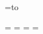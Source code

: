 \headline={\hbox to }
\newtoks\oddhead
\newtoks\evenhead
\newtoks\titlehead
\def\defineheads{
  \ifnum\BodyColumns=2
    \oddhead={\hbox to \columnshift{}\rlap{\RHoddleft}\hfil\RHoddcenter\hfil\hbox to \columnshift{}\llap{\RHoddright}}
    \evenhead={\hbox to \columnshift{}\rlap{\RHevenleft}\hfil\RHevencenter\hfil\hbox to \columnshift{}\llap{\RHevenright}}
    \titlehead={\hbox to \columnshift{}\rlap{\RHtitleleft}\hfil\RHtitlecenter\hfil\hbox to \columnshift{}\llap{\RHtitleright}}
  \else
    \oddhead={\hbox to \columnshift{}\rlap{\RHoddleft}\hfil\RHoddcenter\hfil\llap{\RHoddright}}
    \evenhead={\hbox to \columnshift{}\rlap{\RHevenleft}\hfil\RHevencenter\hfil\llap{\RHevenright}}
    \titlehead={\hbox to \columnshift{}\rlap{\RHtitleleft}\hfil\RHtitlecenter\hfil\llap{\RHtitleright}}
  \fi
}

\footline={{%
 \edef\t@st{\p@gefirstmark}%
 \ifx\t@st\empty \hfil \else
  \ifx\t@st\t@tle \the\titlefoot \else
  \ifodd\pageno \the\oddfoot \else 
    \ifDoubleSided \the\evenfoot \else \the\oddfoot \fi
  \fi\fi\fi}}
\newtoks\oddfoot
\newtoks\evenfoot
\newtoks\titlefoot
\oddfoot={\rlap{\RFoddleft}\hfil\RFoddcenter\hfil\llap{\RFoddright}}
\evenfoot={\rlap{\RFevenleft}\hfil\RFevencenter\hfil\llap{\RFevenright}}
\titlefoot={\rlap{\RFtitleleft}\hfil\RFtitlecenter\hfil\llap{\RFtitleright}}

%
%
\def\firstref{\ifRTL\beginR\fi\f@rstref{\p@gefirstmark}\ifRTL\endR\fi}
\def\lastref{\ifRTL\beginR\fi\l@stref{\p@gebotmark}\ifRTL\endR\fi}
\def\rangeref{\ifRTL\beginR\fi\r@ngerefs{\p@gefirstmark}{\p@gebotmark}\ifRTL\endR\fi}
\let\pagenumber=\folio

%
%
\def\RHoddleft{\empty}
\def\RHoddcenter{\rangeref}
\def\RHoddright{\pagenumber}

\def\RHevenleft{\pagenumber}
\def\RHevencenter{\rangeref}
\def\RHevenright{\empty}

\def\RHtitleleft{\empty}
\def\RHtitlecenter{\empty}
\def\RHtitleright{\empty}

\def\RFoddleft{\empty}
\def\RFoddcenter{\empty}
\def\RFoddright{\empty}

\def\RFevenleft{\empty}
\def\RFevencenter{\empty}
\def\RFevenright{\empty}

\def\RFtitleleft{\empty}
\def\RFtitlecenter{\pagenumber}
\def\RFtitleright{\empty}

\endinput
